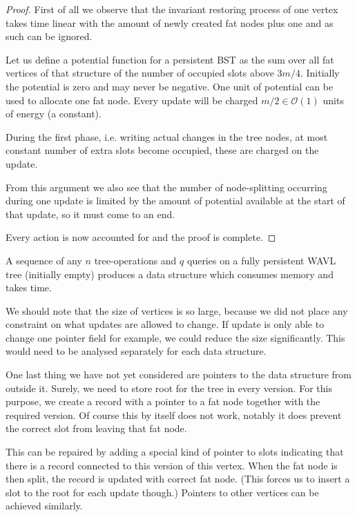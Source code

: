 \begin{proof}
First of all we observe that the invariant restoring process of one vertex takes time linear with the amount of newly created fat nodes plus one and as such can be ignored.
	
Let us define a potential function for a persistent BST as the sum over all fat vertices of that structure of the number of occupied slots above $3m/4$. Initially the potential is zero and may never be negative. One unit of potential can be used to allocate one fat node. Every update will be charged $m/2 \in \mathcal{O}(1)$ units of energy (a constant).

During the first phase, i.e. writing actual changes in the tree nodes, at most constant number of extra slots become occupied, these are charged on the update.


From this argument we also see that the number of node-splitting occurring during one update is limited by the amount of potential available at the start of that update, so it must come to an end.

Every action is now accounted for and the proof is complete.
\end{proof}

\begin{cor}
A sequence of any $n$ tree-operations and $q$ queries on a fully persistent WAVL tree (initially empty) produces a data structure which consumes  memory and takes  time.
\end{cor}

We should note that the size of vertices is so large, because we did not place any constraint on what updates are allowed to change. If update is only able to change one pointer field for example, we could reduce the size significantly. This would need to be analysed separately for each data structure.

One last thing we have not yet considered are pointers to the data structure from outside it. Surely, we need to store root for the tree in every version. For this purpose, we create a record with a pointer to a fat node together with the required version. Of course this by itself does not work, notably it does prevent the correct slot from leaving that fat node. 

This can be repaired by adding a special kind of pointer to slots indicating that there is a record  connected to this version of this vertex. When the fat node is then split, the record is updated with correct fat node. (This forces us to insert a slot to the root for each update though.) Pointers to other vertices can be achieved similarly.

